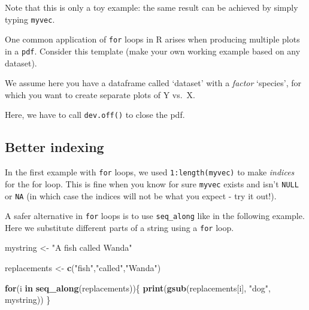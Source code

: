 \documentclass[]{book}
\newenvironment{Shaded}{\begin{snugshade}}{\end{snugshade}}
\newcommand{\ControlFlowTok}[1]{\textcolor[rgb]{0.13,0.29,0.53}{\textbf{#1}}}
\newcommand{\DataTypeTok}[1]{\textcolor[rgb]{0.13,0.29,0.53}{#1}}
\newcommand{\KeywordTok}[1]{\textcolor[rgb]{0.13,0.29,0.53}{\textbf{#1}}}
\newcommand{\NormalTok}[1]{#1}
\newcommand{\OperatorTok}[1]{\textcolor[rgb]{0.81,0.36,0.00}{\textbf{#1}}}
\newcommand{\OtherTok}[1]{\textcolor[rgb]{0.56,0.35,0.01}{#1}}
\newcommand{\StringTok}[1]{\textcolor[rgb]{0.31,0.60,0.02}{#1}}
\begin{document}
Note that this is only a toy example: the same result can be achieved by simply typing \texttt{myvec}.

One common application of \texttt{for} loops in R arises when producing multiple plots in a \texttt{pdf}.
Consider this template (make your own working example based on any dataset).

We assume here you have a dataframe called `dataset' with a \emph{factor} `species', for which you want to create separate plots of Y vs.~X.

\begin{Shaded}
\end{Shaded}

Here, we have to call \texttt{dev.off()} to close the pdf.

\hypertarget{better-indexing}{%
\subsection{Better indexing}\label{better-indexing}}

In the first example with \texttt{for} loops, we used \texttt{1:length(myvec)} to make \emph{indices} for the for loop. This is fine when you know for sure \texttt{myvec} exists and isn't \texttt{NULL} or \texttt{NA} (in which case the indices will not be what you expect - try it out!).

A safer alternative in \texttt{for} loops is to use \texttt{seq\_along} like in the following example. Here we substitute different parts of a string using a \texttt{for} loop.

\begin{Shaded}
\begin{Highlighting}[]
\NormalTok{mystring <-}\StringTok{ "A fish called Wanda"}

\NormalTok{replacements <-}\StringTok{ }\KeywordTok{c}\NormalTok{(}\StringTok{"fish"}\NormalTok{,}\StringTok{"called"}\NormalTok{,}\StringTok{"Wanda"}\NormalTok{)}

\ControlFlowTok{for}\NormalTok{(i }\ControlFlowTok{in} \KeywordTok{seq_along}\NormalTok{(replacements))\{}
  \KeywordTok{print}\NormalTok{(}\KeywordTok{gsub}\NormalTok{(replacements[i], }\StringTok{"dog"}\NormalTok{, mystring))}
\NormalTok{\}}
\end{Highlighting}
\end{Shaded}
\end{document}
